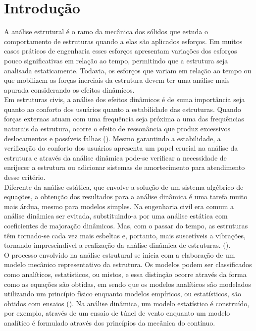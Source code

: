 \chapter{Introdução} 
\label{cap:1}

\indent A análise estrutural é o ramo da mecânica dos sólidos que estuda o comportamento de estruturas quando a elas são aplicados esforços. Em muitos casos práticos de engenharia esses esforços apresentam variações dos esforços pouco significativas em relação ao tempo, permitindo que a estrutura seja analisada estaticamente. Todavia, os esforços que variam em relação ao tempo ou que mobilizem as forças inerciais da estrutura devem ter uma análise mais apurada considerando os efeitos dinâmicos.\\
\indent Em estruturas civis, a análise dos efeitos dinâmicos é de suma importância seja quanto ao conforto dos usuários quanto a estabilidade das estruturas. Quando forças externas atuam com uma frequência seja próxima a uma das frequências naturais da estrutura, ocorre o efeito de ressonância que produz excessivos deslocamentos e possíveis falhas (\citet{mechanicalvibrations2017}). Mesmo garantindo a estabilidade, a verificação do conforto dos usuários apresenta um papel crucial na análise da estrutura e através da análise dinâmica pode-se verificar a necessidade de enrijecer a estrutura ou adicionar sistemas de amortecimento para atendimento desse critério.\\
\indent Diferente da análise estática, que envolve a solução de um sistema algébrico de equações, a obtenção dos resultados para a análise dinâmica é uma tarefa muito mais árdua, mesmo para modelos simples. Na engenharia civil era comum a análise dinâmica ser evitada, substituindo-a por uma análise estática com coeficientes de majoração dinâmicos. 
Mas, com o passar do tempo, as estruturas têm tornado-se cada vez mais esbeltas e, portanto, mais suscetíveis a vibrações, tornando 
imprescindível a realização da análise dinâmica de estruturas. (\citet{modelagemestruturasacomistas2017}).\\
\indent O processo envolvido na análise estrutural se inicia com a elaboração de um modelo mecânico representativo da estrutura. Os modelos podem ser classificados como analíticos, estatísticos, ou mistos, e essa distinção ocorre através da forma como as equações são obtidas, em sendo que os modelos analíticos são modelados utilizando um princípio físico enquanto modelos empíricos, ou estatísticos, são obtidos com ensaios (\citet{licoesemmecanicaestruturasdinamica2022a}). Na análise dinâmica, um modelo estatístico é construído, por exemplo, através de um ensaio de túnel de vento enquanto um modelo analítico é formulado através dos princípios da mecânica do contínuo.\\
